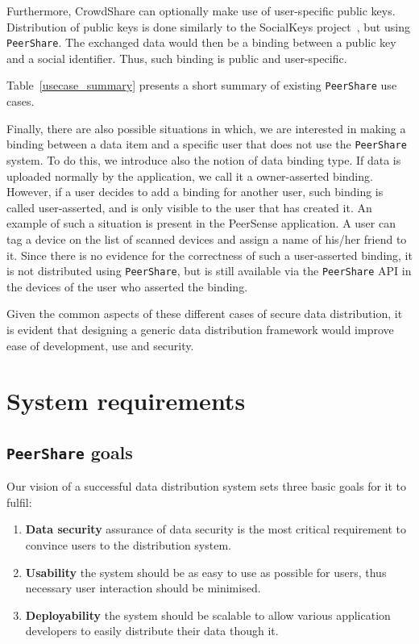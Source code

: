 \documentclass[twocolumn,a4paper,10pt]{article}
\newcommand{\peershare}{\texttt{PeerShare}\xspace}
\begin{document}
Furthermore, CrowdShare can optionally make use of user-specific public keys. Distribution of public keys is done similarly to the SocialKeys project~\cite{socialkeys}, but using \peershare. The exchanged data would then be a binding between a public key and a social identifier. Thus, such binding is public and user-specific.

Table~\ref{usecase_summary} presents a short summary of existing \peershare use cases.

Finally, there are also possible situations in which, we are interested in making a binding between a data item and a specific user that does not use the \peershare system. To do this, we introduce also the notion of data binding type. If data is uploaded normally by the application, we call it a owner-asserted binding. However, if a user decides to add a binding for another user, such binding is called user-asserted, and is only visible to the user that has created it. An example of such a situation is present in the PeerSense application. A user can tag a device on the list of scanned devices and assign a name of his/her friend to it. Since there is no evidence for the correctness of such a user-asserted binding, it is not distributed using \peershare, but is still available via the \peershare API in the devices of the user who asserted the binding.

Given the common aspects of these different cases of secure data distribution, it is evident that designing a generic data distribution framework would improve ease of development, use and security.

\section{System requirements}
\label{:requirements}
\subsection{\peershare goals}
Our vision of a successful data distribution system sets three basic goals for it to fulfil:
\begin{enumerate}
\item \textbf{Data security}  assurance of data security is the most critical requirement to convince users to the distribution system. 
\item \textbf{Usability}  the system should be as easy to use as possible for users, thus necessary user interaction should be minimised.
\item \textbf{Deployability}  the system should be scalable to allow various application developers to easily distribute their data though it.
\end{enumerate}
\end{document}
